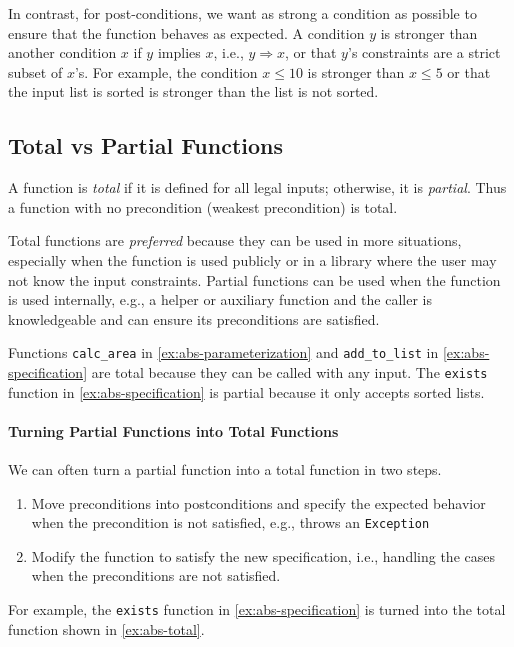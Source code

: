 \documentclass[oneside,11pt,dvipsnames]{book}
\renewcommand{\implies}{\Rightarrow}
\newcommand{\code}[1]{\texttt{#1}}
\begin{document}
In contrast, for post-conditions, we want as strong a condition as possible to ensure that the function behaves as expected. A condition $y$ is stronger than another condition $x$ if $y$ implies $x$, i.e., $y \implies x$, or that $y$'s constraints are a strict subset of $x$'s. For example, the condition $x \le 10$ is stronger than $x \le 5$ or that the input list is sorted is stronger than the list is not sorted.


\subsection{Total vs Partial Functions}\label{sec:total-partial-function}

A function is \emph{total} if it is defined for all legal inputs; otherwise, it is \emph{partial}. Thus a function with no precondition (weakest precondition) is total.  

Total functions are \emph{preferred} because they can be used in more situations, especially when the function is used publicly or in a library where the user may not know the input constraints. Partial functions can be used when the function is used internally, e.g., a helper or auxiliary function and the caller is knowledgeable and can ensure its preconditions are satisfied.

Functions \code{calc\_area} in \autoref{ex:abs-parameterization} and \code{add\_to\_list} in \autoref{ex:abs-specification} are total because they can be called with any input. The \code{exists} function in \autoref{ex:abs-specification} is partial because it only accepts sorted lists.


\paragraph{Turning Partial Functions into Total Functions} We can often turn a partial function into a total function in two steps. 
\begin{enumerate}
\item Move preconditions into postconditions and specify the expected behavior when the precondition is not satisfied, e.g., throws an \code{Exception}
\item Modify the function to satisfy the new specification, i.e., handling the cases when the preconditions are not satisfied. 
\end{enumerate}

For example, the \code{exists} function in \autoref{ex:abs-specification} is turned into the total function shown in \autoref{ex:abs-total}.
\end{document}
